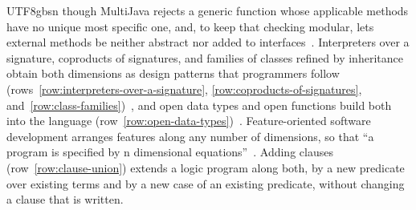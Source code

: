 \begin{CJK*}{UTF8}{gbsn}
though MultiJava rejects a generic function whose applicable methods have no unique most specific one,
and, to keep that checking modular, lets external methods be neither abstract nor added to
interfaces~\cite[pp.~134--135]{clifton2000-multijava}.
Interpreters over a signature, coproducts of signatures, and families of classes refined by inheritance
obtain both dimensions as design patterns that programmers follow
(rows~\ref{row:interpreters-over-a-signature}, \ref{row:coproducts-of-signatures},
and~\ref{row:class-families})~\cite{carette2009-finally-tagless, oliveira2012-object-algebras, swierstra2008-data-types-a-la-carte, odersky2005-scalable-components, wang2016-expression-problem-trivially},
and open data types and open functions build both into the language
(row~\ref{row:open-data-types})~\cite{loh2006-open-data-types}.
Feature-oriented software development arranges features along any number of dimensions, so that ``a
program is specified by n dimensional
equations''~\cite[pp.~48, 52]{batory2003-refinements-multi-dimensional}.
Adding clauses (row~\ref{row:clause-union}) extends a logic program along both, by a new predicate over
existing terms and by a new case of an existing predicate, without changing a clause that is written.
\fi


\end{CJK*}
